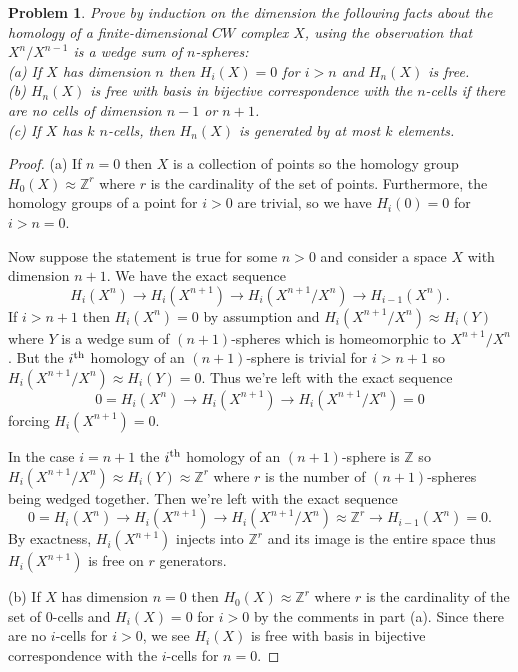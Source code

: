 \documentclass{article}
\newtheorem{problem}{Problem}
\begin{document}
\begin{problem}
\label{cw}
Prove by induction on the dimension the following facts about the homology of a finite-dimensional $CW$ complex $X$, using the observation that $X^n/X^{n-1}$ is a wedge sum of $n$-spheres:\\
(a) If $X$ has dimension $n$ then $H_i(X) = 0$ for $i > n$ and $H_n(X)$ is free.\\
(b) $H_n(X)$ is free with basis in bijective correspondence with the $n$-cells if there are no cells of dimension $n-1$ or $n+1$.\\
(c) If $X$ has $k$ $n$-cells, then $H_n(X)$ is generated by at most $k$ elements.
\end{problem}
\begin{proof}
(a) If $n = 0$ then $X$ is a collection of points so the homology group $H_0(X) \approx \mathbb{Z}^r$ where $r$ is the cardinality of the set of points. Furthermore, the homology groups of a point for $i > 0$ are trivial, so we have $H_i(0) = 0$ for $i > n = 0$.

Now suppose the statement is true for some $n>0$ and consider a space $X$ with dimension $n+1$. We have the exact sequence
\[
H_i(X^n) \to H_i(X^{n+1}) \to H_i(X^{n+1}/X^n) \to H_{i-1}(X^n).
\]
If $i > n+1$ then $H_i(X^n) = 0$ by assumption and $H_i(X^{n+1}/X^n) \approx H_i(Y)$ where $Y$ is a wedge sum of $(n+1)$-spheres which is homeomorphic to $X^{n+1}/X^n$. But the $i^{\textup{th}}$ homology of an $(n+1)$-sphere is trivial for $i > n+1$ so $H_i(X^{n+1}/X^n) \approx H_i(Y) = 0$. Thus we're left with the exact sequence
\[
0 = H_i(X^n) \to H_i(X^{n+1}) \to H_i(X^{n+1}/X^n) = 0
\]
forcing $H_i(X^{n+1}) = 0$.

In the case $i = n+1$ the $i^{\textup{th}}$ homology of an $(n+1)$-sphere is $\mathbb{Z}$ so $H_i(X^{n+1}/X^n) \approx H_i(Y) \approx \mathbb{Z}^r$ where $r$ is the number of $(n+1)$-spheres being wedged together. Then we're left with the exact sequence
\[
0 = H_i(X^n) \to H_i(X^{n+1}) \to H_i(X^{n+1}/X^n) \approx \mathbb{Z}^r \to H_{i-1}(X^n) = 0.
\]
By exactness, $H_i(X^{n+1})$ injects into $\mathbb{Z}^r$ and its image is the entire space thus $H_i(X^{n+1})$ is free on $r$ generators.

(b) If $X$ has dimension $n = 0$ then $H_0(X) \approx \mathbb{Z}^r$ where $r$ is the cardinality of the set of $0$-cells and $H_i(X) = 0$ for $i > 0$ by the comments in part (a). Since there are no $i$-cells for $i > 0$, we see $H_i(X)$ is free with basis in bijective correspondence with the $i$-cells for $n = 0$.


\end{proof}
\end{document}

